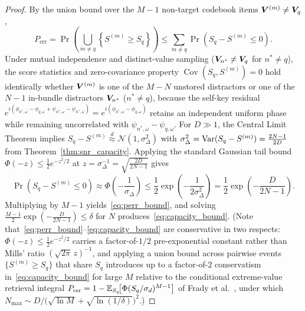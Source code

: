 \begin{proof}
By the union bound over the $M - 1$ non-target codebook items $\boldsymbol{V}^{(m)} \neq \boldsymbol{V}_q$,
\begin{equation*}
    P_{\mathrm{err}} = \Pr\!\left(\bigcup_{m \neq q} \left\{ S^{(m)} \ge S_q \right\}\right)
    \le \sum_{m \neq q} \Pr\!\left(S_q - S^{(m)} \le 0\right).
\end{equation*}
Under mutual independence and distinct-value sampling ($\boldsymbol{V}_{n^*} \neq \boldsymbol{V}_q$ for $n^* \neq q$), the score statistics and zero-covariance property $\operatorname{Cov}(S_q, S^{(m)}) = 0$ hold identically whether $\boldsymbol{V}^{(m)}$ is one of the $M - N$ unstored distractors or one of the $N - 1$ in-bundle distractors $\boldsymbol{V}_{n^*}$ ($n^* \neq q$), because the self-key residual $e^{i(\phi_{n^*,\omega} - \phi_{q,\omega} + \psi_{n^*,\omega} - \psi_{n^*,\omega})} = e^{i(\phi_{n^*,\omega} - \phi_{q,\omega})}$ retains an independent uniform phase while remaining uncorrelated with $\psi_{n^*,\omega} - \psi_{q,\omega}$.
For $D \gg 1$, the Central Limit Theorem implies $S_q - S^{(m)} \overset{d}{\approx} \mathcal{N}\!\left(1, \sigma_\Delta^2\right)$ with $\sigma_\Delta^2 = \operatorname{Var}(S_q - S^{(m)}) = \frac{2N - 1}{2D}$ from Theorem~\ref{thm:snr_capacity}.
Applying the standard Gaussian tail bound $\Phi(-z) \le \frac{1}{2}e^{-z^2/2}$ at $z = \sigma_\Delta^{-1} = \sqrt{\frac{2D}{2N - 1}}$ gives
\begin{equation*}
    \Pr\!\left(S_q - S^{(m)} \le 0\right)
    \approx \Phi\!\left(-\frac{1}{\sigma_\Delta}\right)
    \le \frac{1}{2} \exp\!\left(-\frac{1}{2\sigma_\Delta^2}\right)
    = \frac{1}{2} \exp\!\left(-\frac{D}{2N - 1}\right).
\end{equation*}
Multiplying by $M - 1$ yields~\eqref{eq:perr_bound}, and solving $\frac{M-1}{2}\exp\!\left(-\frac{D}{2N-1}\right) \le \delta$ for $N$ produces~\eqref{eq:capacity_bound}.
(Note that~\eqref{eq:perr_bound}--\eqref{eq:capacity_bound} are conservative in two respects: $\Phi(-z) \le \frac{1}{2}e^{-z^2/2}$ carries a factor-of-$1/2$ pre-exponential constant rather than Mills' ratio $(\sqrt{2\pi}\,z)^{-1}$, and applying a union bound across pairwise events $\{S^{(m)} \ge S_q\}$ that share $S_q$ introduces up to a factor-of-$2$ conservatism in~\eqref{eq:capacity_bound} for large $M$ relative to the conditional extreme-value retrieval integral $P_{\mathrm{err}} = 1 - \mathbb{E}_{S_q}\!\bigl[\Phi(S_q / \sigma_d)^{M-1}\bigr]$ of Frady et al.~\cite{FRADY_CAPACITY_VSA}, under which $N_{\max} \sim D / \bigl(\sqrt{\ln M} + \sqrt{\ln(1/\delta)}\bigr)^2$.)
\end{proof}

